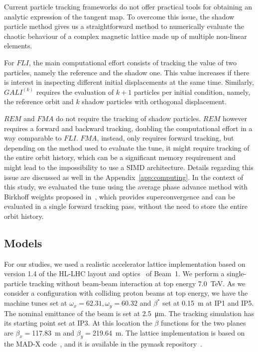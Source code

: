 Current particle tracking frameworks do not offer practical tools for obtaining an analytic expression of the tangent map. To overcome this issue, the shadow particle method gives us a straightforward method to numerically evaluate the chaotic behaviour of a complex magnetic lattice made up of multiple non-linear elements.

For $FLI$, the main computational effort consists of tracking the value of two particles, namely the reference and the shadow one. This value increases if there is interest in inspecting different initial displacements at the same time. Similarly, $GALI^{(k)}$ requires the evaluation of $k+1$ particles per initial condition, namely, the reference orbit and $k$ shadow particles with orthogonal displacement.

$REM$ and $FMA$ do not require the tracking of shadow particles. $REM$ however requires a forward and backward tracking, doubling the computational effort in a way comparable to $FLI$. $FMA$, instead, only requires forward tracking, but depending on the method used to evaluate the tune, it might require tracking of the entire orbit history, which can be a significant memory requirement and might lead to the impossibility to use a SIMD architecture. Details regarding this issue are discussed as well in the Appendix~\ref{app:computing}. In the context of this study, we evaluated the tune using the average phase advance method with Birkhoff weights proposed in~\cite{russo:ipac2021-thpab189}, which provides superconvergence and can be evaluated in a single forward tracking pass, without the need to store the entire orbit history.

\subsection{Models} \label{sec:model}
%
For our studies, we used a realistic accelerator lattice implementation based on version 1.4 of the HL-LHC layout and optics~\cite{Maria_2019} of Beam~1. We perform a single-particle tracking without beam-beam interaction at top energy \SI{7.0}{TeV}. As we consider a configuration with colliding proton beams at top energy, we have the machine tunes set at $\omega_x=62.31, \omega_y=60.32$ and $\beta^\ast$ set at \SI{0.15}{\meter} at IP1 and IP5. The nominal emittance of the beam is set at \SI{2.5}{\micro \meter}. The tracking simulation has its starting point set at IP3. At this location the $\beta$ functions for the two planes are $\beta_x=$\SI{117.83}{\meter} and $\beta_y=$\SI{219.64}{\meter}. The lattice implementation is based on the MAD-X code~\cite{madx}, and it is available in the pymask repository~\cite{pymask}.


